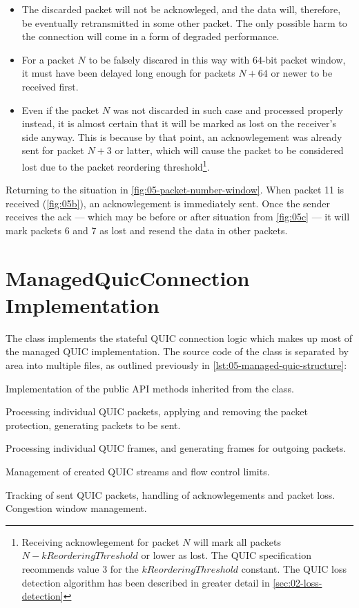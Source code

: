 \begin{itemize}

  \item The discarded packet will not be acknowleged, and the data will, therefore, be eventually retransmitted in some other packet. The only possible harm to the connection will come in a form of degraded performance.

  \item For a packet $N$ to be falsely discared in this way with 64-bit packet window, it must have been delayed long enough for packets $N+64$ or newer to be received first.

  \item Even if the packet $N$ was not discarded in such case and processed properly instead, it is
almost certain that it will be marked as lost on the receiver's side anyway. This is because by that
point, an acknowlegement was already sent for packet $N+3$ or latter, which will cause the packet to
be considered lost due to the packet reordering threshold\footnote{Receiving acknowlegement for
packet $N$ will mark all packets $N - kReorderingThreshold$ or lower as lost. The QUIC specification
recommends value 3 for the $kReorderingThreshold$ constant. The QUIC loss detection algorithm has
been described in greater detail in \autoref{sec:02-loss-detection}}.

\end{itemize}

Returning to the situation in \autoref{fig:05-packet-number-window}. When packet 11 is received
(\autoref{fig:05b}), an acknowlegement is immediately sent. Once the sender receives the ack --- which
may be before or after situation from \autoref{fig:05c} --- it will mark packets 6 and 7 as lost and
resend the data in other packets.

\section{ManagedQuicConnection Implementation}

The \ManagedQuicConnection{} class implements the stateful QUIC connection logic which makes up most
of the managed QUIC implementation. The source code of the \ManagedQuicConnection{} class is
separated by area into multiple files, as outlined previously in
\autoref{lst:05-managed-quic-structure}:

\begin{itemize}

   Implementation of the public API methods inherited from the \QuicConnectionProvider{} class.

   Processing individual QUIC packets, applying and removing the packet protection, generating packets to be sent.

   Processing individual QUIC frames, and generating frames for outgoing packets.

   Management of created QUIC streams and flow control limits.

   Tracking of sent QUIC packets, handling of acknowlegements and packet loss. Congestion window management.

\end{itemize}

